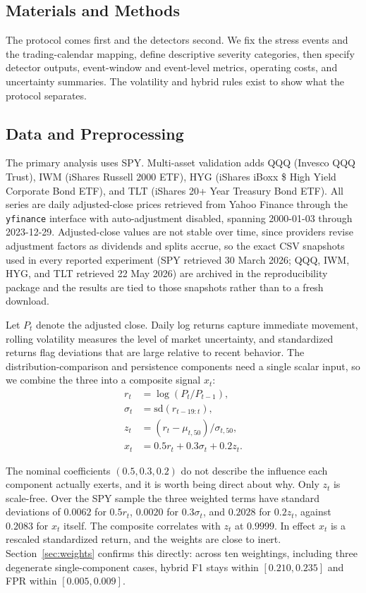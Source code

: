 \documentclass{book}
\begin{document}
\begin{multicols}{2}
\section{Materials and Methods}
The protocol comes first and the detectors second. We fix the stress events and the trading-calendar mapping, define descriptive severity categories, then specify detector outputs, event-window and event-level metrics, operating costs, and uncertainty summaries. The volatility and hybrid rules exist to show what the protocol separates.

\subsection{Data and Preprocessing}
The primary analysis uses SPY. Multi-asset validation adds QQQ (Invesco QQQ Trust), IWM (iShares Russell 2000 ETF), HYG (iShares iBoxx \$ High Yield Corporate Bond ETF), and TLT (iShares 20+ Year Treasury Bond ETF). All series are daily adjusted-close prices retrieved from Yahoo Finance through the \texttt{yfinance} interface with auto-adjustment disabled, spanning 2000-01-03 through 2023-12-29. Adjusted-close values are not stable over time, since providers revise adjustment factors as dividends and splits accrue, so the exact CSV snapshots used in every reported experiment (SPY retrieved 30 March 2026; QQQ, IWM, HYG, and TLT retrieved 22 May 2026) are archived in the reproducibility package and the results are tied to those snapshots rather than to a fresh download.

Let $P_t$ denote the adjusted close. Daily log returns capture immediate movement, rolling volatility measures the level of market uncertainty, and standardized returns flag deviations that are large relative to recent behavior. The distribution-comparison and persistence components need a single scalar input, so we combine the three into a composite signal $x_t$:
\begin{align}
r_t &= \log(P_t/P_{t-1}),\\
\sigma_t &= \mathrm{sd}(r_{t-19:t}),\\
z_t &= (r_t-\mu_{t,50})/\sigma_{t,50},\\
x_t &= 0.5r_t + 0.3\sigma_t + 0.2z_t.
\end{align}

The nominal coefficients $(0.5,0.3,0.2)$ do not describe the influence each component actually exerts, and it is worth being direct about why. Only $z_t$ is scale-free. Over the SPY sample the three weighted terms have standard deviations of $0.0062$ for $0.5r_t$, $0.0020$ for $0.3\sigma_t$, and $0.2028$ for $0.2z_t$, against $0.2083$ for $x_t$ itself. The composite correlates with $z_t$ at $0.9999$. In effect $x_t$ is a rescaled standardized return, and the weights are close to inert. Section~\ref{sec:weights} confirms this directly: across ten weightings, including three degenerate single-component cases, hybrid F1 stays within $[0.210, 0.235]$ and FPR within $[0.005, 0.009]$.


\end{multicols}
\end{document}

